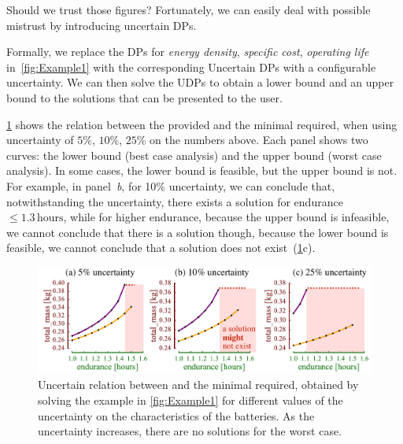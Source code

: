 Should we trust those figures? Fortunately, we can easily deal with
possible mistrust by introducing uncertain DPs.

Formally, we replace the DPs for\emph{ energy density}, \emph{specific
cost}, \emph{operating life} in~\cref{fig:Example1} with the
corresponding Uncertain DPs with a configurable uncertainty. We can
then solve the UDPs to obtain a lower bound and an upper bound to
the solutions that can be presented to the user.

\cref{fig:unc_battery_uncertain} shows the relation between
the provided  and the minimal  required,
when using uncertainty of $5\%$, $10\%$, $25\%$ on the numbers
above. Each panel shows two curves: the lower bound (best case analysis)
and the upper bound (worst case analysis). In some cases, the lower
bound is feasible, but the upper bound is not. For example, in panel~\emph{b},
for 10\% uncertainty, we can conclude that, notwithstanding the uncertainty,
there exists a solution for endurance~$\leq1.3\,\text{hours}$, while
for higher endurance, because the upper bound is infeasible, we cannot
conclude that there is a solution \textemdash{} though, because the
lower bound is feasible, we cannot conclude that a solution does not
exist~(\cref{fig:unc_battery_uncertain}c).
\begin{center}
  \begin{figure}[h]
    \begin{centering}
      \includegraphics[scale=0.33]{unc_battery_uncertain}
      \par
    \end{centering}
    \caption{\label{fig:unc_battery_uncertain}Uncertain relation between 
    and the minimal  required, obtained by solving the
    example in \cref{fig:Example1} for different values of the uncertainty
    on the characteristics of the batteries. As the uncertainty increases,
    there are no solutions for the worst case.}
  \end{figure}
  \par
\end{center}

